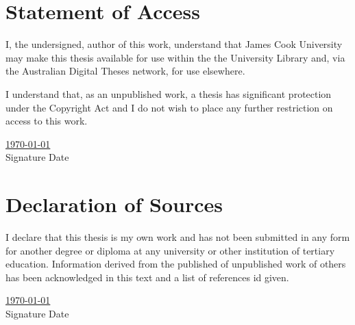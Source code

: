 \documentclass[12pt]{article}
\begin{document}
\section*{Statement of Access}
I, the undersigned, author of this work, understand that James Cook University may make this thesis available for use within the the University Library and, via the Australian Digital Theses network, for use elsewhere. \\ 
\vspace{2cm}

I understand that, as an unpublished work, a thesis has significant protection under the Copyright Act and I do not wish to place any further restriction on access to this work. \\ 
\vspace{5cm}

\underline{\hspace{4cm}} \hfill \underline{\hspace{3cm} \today}  \\ 
Signature \hfill Date \\


\pagebreak







\section*{Declaration of Sources}
I declare that this thesis is my own work and has not been submitted in any form for another degree or diploma at any university or other institution of tertiary education. Information derived from the published of unpublished work of others has been acknowledged in this text and a list of references id given. 
\vspace{5cm}

\underline{\hspace{4cm}} \hfill \underline{\hspace{3cm} \today}  \\ 
Signature \hfill Date \\


\pagebreak
\end{document}
